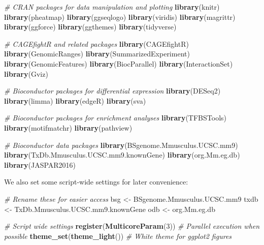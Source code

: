 \documentclass[9pt,a4paper,]{extarticle}
\newenvironment{Shaded}{\begin{snugshade}}{\end{snugshade}}
\newcommand{\KeywordTok}[1]{\textcolor[rgb]{0.13,0.29,0.53}{\textbf{{#1}}}}
\newcommand{\DecValTok}[1]{\textcolor[rgb]{0.00,0.00,0.81}{{#1}}}
\newcommand{\StringTok}[1]{\textcolor[rgb]{0.31,0.60,0.02}{{#1}}}
\newcommand{\CommentTok}[1]{\textcolor[rgb]{0.56,0.35,0.01}{\textit{{#1}}}}
\newcommand{\NormalTok}[1]{{#1}}
\begin{document}
\begin{Shaded}
\begin{Highlighting}[]
\CommentTok{# CRAN packages for data manipulation and plotting}
\KeywordTok{library}\NormalTok{(knitr)}
\KeywordTok{library}\NormalTok{(pheatmap)}
\KeywordTok{library}\NormalTok{(ggseqlogo)}
\KeywordTok{library}\NormalTok{(viridis)}
\KeywordTok{library}\NormalTok{(magrittr)}
\KeywordTok{library}\NormalTok{(ggforce)}
\KeywordTok{library}\NormalTok{(ggthemes)}
\KeywordTok{library}\NormalTok{(tidyverse)}

\CommentTok{# CAGEfightR and related packages}
\KeywordTok{library}\NormalTok{(CAGEfightR)}
\KeywordTok{library}\NormalTok{(GenomicRanges)}
\KeywordTok{library}\NormalTok{(SummarizedExperiment)}
\KeywordTok{library}\NormalTok{(GenomicFeatures)}
\KeywordTok{library}\NormalTok{(BiocParallel)}
\KeywordTok{library}\NormalTok{(InteractionSet)}
\KeywordTok{library}\NormalTok{(Gviz)}

\CommentTok{# Bioconductor packages for differential expression}
\KeywordTok{library}\NormalTok{(DESeq2)}
\KeywordTok{library}\NormalTok{(limma)}
\KeywordTok{library}\NormalTok{(edgeR)}
\KeywordTok{library}\NormalTok{(sva)}

\CommentTok{# Bioconductor packages for enrichment analyses}
\KeywordTok{library}\NormalTok{(TFBSTools)}
\KeywordTok{library}\NormalTok{(motifmatchr)}
\KeywordTok{library}\NormalTok{(pathview)}

\CommentTok{# Bioconductor data packages}
\KeywordTok{library}\NormalTok{(BSgenome.Mmusculus.UCSC.mm9)}
\KeywordTok{library}\NormalTok{(TxDb.Mmusculus.UCSC.mm9.knownGene)}
\KeywordTok{library}\NormalTok{(org.Mm.eg.db)}
\KeywordTok{library}\NormalTok{(JASPAR2016)}
\end{Highlighting}
\end{Shaded}

We also set some script-wide settings for later convenience:

\begin{Shaded}
\begin{Highlighting}[]
\CommentTok{# Rename these for easier access}
\NormalTok{bsg <-}\StringTok{ }\NormalTok{BSgenome.Mmusculus.UCSC.mm9}
\NormalTok{txdb <-}\StringTok{ }\NormalTok{TxDb.Mmusculus.UCSC.mm9.knownGene}
\NormalTok{odb <-}\StringTok{ }\NormalTok{org.Mm.eg.db}

\CommentTok{# Script wide settings}
\KeywordTok{register}\NormalTok{(}\KeywordTok{MulticoreParam}\NormalTok{(}\DecValTok{3}\NormalTok{)) }\CommentTok{# Parallel execution when possible}
\KeywordTok{theme_set}\NormalTok{(}\KeywordTok{theme_light}\NormalTok{()) }\CommentTok{# White theme for ggplot2 figures}
\end{Highlighting}
\end{Shaded}
\end{document}
